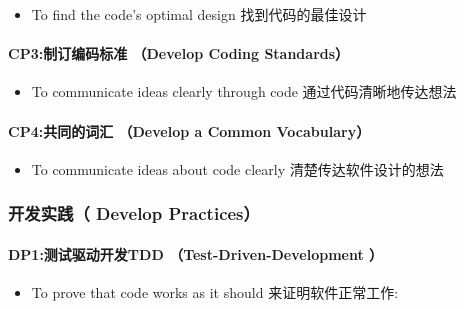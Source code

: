 \begin{itemize}
\tightlist
\item
  To find the code's optimal design 找到代码的最佳设计
\end{itemize}

\hypertarget{cp3ux5236ux8ba2ux7f16ux7801ux6807ux51c6-develop-coding-standards}{%
\paragraph{CP3:制订编码标准 （Develop Coding
Standards）}\label{cp3ux5236ux8ba2ux7f16ux7801ux6807ux51c6-develop-coding-standards}}

\begin{itemize}
\tightlist
\item
  To communicate ideas clearly through code 通过代码清晰地传达想法
\end{itemize}

\hypertarget{cp4ux5171ux540cux7684ux8bcdux6c47-develop-a-common-vocabulary}{%
\paragraph{CP4:共同的词汇 （Develop a Common
Vocabulary）}\label{cp4ux5171ux540cux7684ux8bcdux6c47-develop-a-common-vocabulary}}

\begin{itemize}
\tightlist
\item
  To communicate ideas about code clearly 清楚传达软件设计的想法
\end{itemize}

\hypertarget{ux5f00ux53d1ux5b9eux8df5-develop-practices}{%
\subsubsection{开发实践（ Develop
Practices）}\label{ux5f00ux53d1ux5b9eux8df5-develop-practices}}

\hypertarget{dp1ux6d4bux8bd5ux9a71ux52a8ux5f00ux53d1tdd-test-driven-development}{%
\paragraph{DP1:测试驱动开发TDD （Test-Driven-Development
）}\label{dp1ux6d4bux8bd5ux9a71ux52a8ux5f00ux53d1tdd-test-driven-development}}

\begin{itemize}
\tightlist
\item
  To prove that code works as it should 来证明软件正常工作:\\
\end{itemize}

